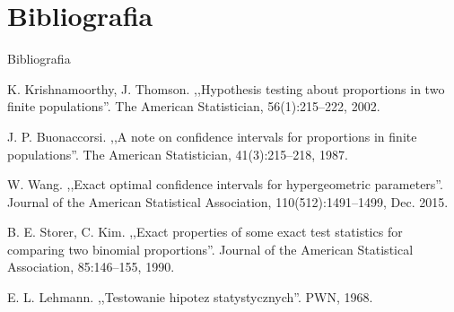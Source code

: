 \documentclass{beamer}
\newcommand{\1}[1]{\mathds{1}\left(#1\right)}
\begin{document}
\section{Bibliografia}
\begin{frame}{Bibliografia}
\begin{thebibliography}{9}
	\beamertemplatearticlebibitems
	K. Krishnamoorthy, J. Thomson. ,,Hypothesis testing about proportions in two
	finite populations''. The American Statistician, 56(1):215–222, 2002.
	
	J. P. Buonaccorsi. ,,A note on confidence intervals for proportions in finite
	populations''. The American Statistician, 41(3):215–218, 1987.
	

	W. Wang. ,,Exact optimal confidence intervals for hypergeometric parameters''.
	Journal of the American Statistical Association, 110(512):1491–1499, Dec.
	2015.
	
	B. E. Storer, C. Kim. ,,Exact properties of some exact test statistics for comparing
	two binomial proportions''. Journal of the American Statistical Association,
	85:146–155, 1990.
	
	\beamertemplatebookbibitems
	E. L. Lehmann. ,,Testowanie hipotez statystycznych''. PWN, 1968.
	
\end{thebibliography}
\end{frame}
\end{document}
